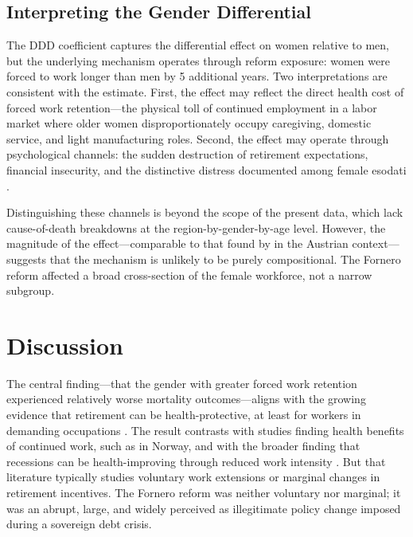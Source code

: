 \documentclass[12pt]{article}
\begin{document}


\subsection{Interpreting the Gender Differential}

The DDD coefficient captures the differential effect on women relative to men, but the underlying mechanism operates through reform exposure: women were forced to work longer than men by 5 additional years. Two interpretations are consistent with the estimate. First, the effect may reflect the direct health cost of forced work retention---the physical toll of continued employment in a labor market where older women disproportionately occupy caregiving, domestic service, and light manufacturing roles. Second, the effect may operate through psychological channels: the sudden destruction of retirement expectations, financial insecurity, and the distinctive distress documented among female esodati \citep{serrano2023}.

Distinguishing these channels is beyond the scope of the present data, which lack cause-of-death breakdowns at the region-by-gender-by-age level. However, the magnitude of the effect---comparable to that found by \citet{kuhn2020} in the Austrian context---suggests that the mechanism is unlikely to be purely compositional. The Fornero reform affected a broad cross-section of the female workforce, not a narrow subgroup.

\section{Discussion}

The central finding---that the gender with greater forced work retention experienced relatively worse mortality outcomes---aligns with the growing evidence that retirement can be health-protective, at least for workers in demanding occupations \citep{bloemen2017, hallberg2015}. The result contrasts with studies finding health benefits of continued work, such as \citet{hernaes2013} in Norway, and with the broader finding that recessions can be health-improving through reduced work intensity \citep{ruhm2000}. But that literature typically studies voluntary work extensions or marginal changes in retirement incentives. The Fornero reform was neither voluntary nor marginal; it was an abrupt, large, and widely perceived as illegitimate policy change imposed during a sovereign debt crisis.
\end{document}
